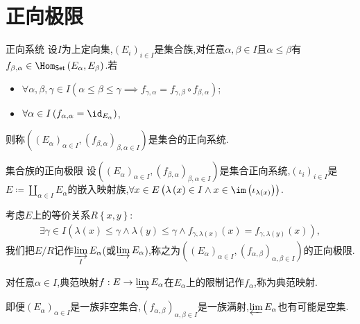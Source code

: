 \section{正向极限}

\begin{definition}{正向系统}{}
	设$I$为上定向集,$\left(E_{i}\right)_{i\in I}$是集合族,对任意$\alpha,\beta\in I$且$\alpha\leq\beta$有$f_{\beta,\alpha}\in\Hom_{\mathsf{Set}}\left(E_{\alpha},E_{\beta}\right)$.若
	\begin{itemize}
		\item $\forall\alpha,\beta,\gamma\in I\left(\alpha\leq\beta\leq\gamma\implies f_{\gamma,\alpha}=f_{\gamma,\beta}\circ f_{\beta,\alpha}\right)$;
		\item $\forall\alpha\in I\left(f_{\alpha,\alpha}=\id_{E_{\alpha}}\right)$,
	\end{itemize}
	则称$\left(\left(E_{\alpha}\right)_{\alpha\in I},\left(f_{\beta,\alpha}\right)_{\beta,\alpha\in I}\right)$是集合的正向系统.
\end{definition}

\begin{definition}{集合族的正向极限}{}
	设$\left(\left(E_{\alpha}\right)_{\alpha\in I},\left(f_{\beta,\alpha}\right)_{\beta,\alpha\in I}\right)$是集合正向系统,$\left(\iota_{i}\right)_{i\in I}$是$E\coloneq\coprod\limits_{\alpha\in I}E_{\alpha}$的嵌入映射族,$\forall x\in E\left(\lambda\left(x\right)\in I\wedge x\in\im\left(\iota_{\lambda\left(x\right)}\right)\right)$.
	
	考虑$E$上的等价关系$R\left\{x,y\right\}$:
	\begin{align*}
		\exists\gamma\in I\left(\lambda\left(x\right)\leq\gamma\wedge\lambda\left(y\right)\leq\gamma\wedge f_{\gamma,\lambda\left(x\right)}\left(x\right)=f_{\gamma,\lambda\left(y\right)}\left(x\right)\right),
	\end{align*}
	我们把$E/R$记作$\varinjlim\limits_{I}E_{\alpha}$(或$\varinjlim E_{\alpha}$),称之为$\left(\left(E_{\alpha}\right)_{\alpha\in I},\left(f_{\alpha,\beta}\right)_{\alpha,\beta\in I}\right)$的正向极限.

	对任意$\alpha\in I$,典范映射$f:E\to\varinjlim E_{\alpha}$在$E_{\alpha}$上的限制记作$f_{\alpha}$,称为典范映射.
\end{definition}

\begin{remark}{}{}
	即便$\left(E_{\alpha}\right)_{\alpha\in I}$是一族非空集合,$\left(f_{\alpha,\beta}\right)_{\alpha,\beta\in I}$是一族满射,$\varprojlim E_{\alpha}$也有可能是空集.
\end{remark}

